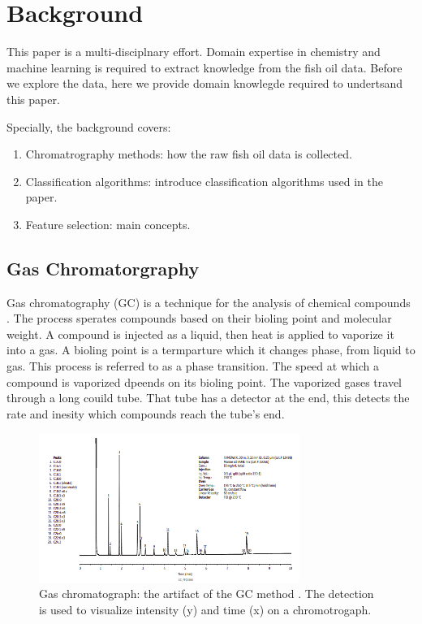 \documentclass[runningheads]{llncs}
\begin{document}
\section{Background}

This paper is a multi-disciplnary effort.
Domain expertise in chemistry and machine learning is required to extract knowledge from the fish oil data. 
Before we explore the data, here we provide domain knowlegde required to undertsand this paper. 

Specially, the background covers: 
\begin{enumerate}
    \item Chromatrography methods: how the raw fish oil data is collected. 
    \item Classification algorithms: introduce classification algorithms used in the paper. 
    \item Feature selection: main concepts. 
\end{enumerate}

\subsection{Gas Chromatorgraphy}

Gas chromatography (GC) is a technique for the analysis of chemical compounds \cite{eder1995gas,restek2018high,khan2013gas}.
The process sperates compounds based on their bioling point and molecular weight.
A compound is injected as a liquid, then heat is applied to vaporize it into a gas. 
A bioling point is a termparture which it changes phase, from liquid to gas. 
This process is referred to as a phase transition. 
The speed at which a compound is vaporized dpeends on its bioling point. 
The vaporized gases travel through a long couild tube.
That tube has a detector at the end, this detects the rate and inesity which compounds reach the tube's end. 

\begin{figure}[htb]
    \centering
    \includegraphics[width=8.5cm]{chromatograph.png}
    \caption{
      Gas chromatograph: the artifact of the GC method \cite{restek2018high}.
      The detection is used to visualize intensity (y) and time (x) on a chromotrogaph.}
    \label{fig:gas-chromatography}%
    \captionsetup[figure]{font=small,labelfont=small}
\end{figure}
\end{document}
